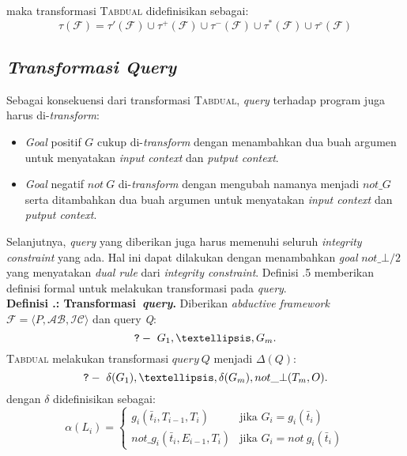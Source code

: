 maka transformasi \textsc{Tabdual} didefinisikan sebagai:
\begin{displaymath}
	\tau(\mathcal{F}) = \tau'(\mathcal{F}) \cup \tau^+(\mathcal{F}) \cup \tau^-(\mathcal{F}) \cup \tau^*(\mathcal{F}) \cup \tau^\circ(\mathcal{F})
\end{displaymath}

\subsection{\textit{Transformasi \textit{Query}}}
\label{transquery}

Sebagai konsekuensi dari transformasi \textsc{Tabdual}, \textit{query} terhadap program juga harus di-\textit{transform}:

\begin{itemize}
	\item \textit{Goal} positif $G$ cukup di-\textit{transform} dengan menambahkan dua buah argumen untuk menyatakan \textit{input context} dan \textit{putput context}.
	\item \textit{Goal} negatif $not \ G$ di-\textit{transform} dengan mengubah namanya menjadi $not\_G$ serta ditambahkan dua buah argumen untuk menyatakan \textit{input context} dan \textit{putput context}.
\end{itemize}

Selanjutnya, \textit{query} yang diberikan juga harus memenuhi seluruh \textit{integrity constraint} yang ada. Hal ini dapat dilakukan dengan menambahkan \textit{goal} $not\_\bot/2$ yang menyatakan \textit{dual rule} dari \textit{integrity constraint}. Definisi \thebabTigaNum.5 memberikan definisi formal untuk melakukan transformasi pada \textit{query}.
\\

\noindent \textbf{Definisi \thebabTigaNum.\thedefBabTiga: Transformasi\ \textit{query}.} Diberikan \textit{abductive framework} $\mathcal{F} = \langle  P,\mathcal{AB},\mathcal{IC} \rangle$ dan query \textit{Q}:
\begin{displaymath}
	\text{\texttt{?}}- \ G_1, \textellipsis , G_m.
\end{displaymath}
\textsc{Tabdual} melakukan transformasi $query \ Q$ menjadi $\Delta(Q)$:
\begin{displaymath}
	\text{\texttt{?}}- \ \delta(G_1), \textellipsis , \delta(G_m), not\_\bot(T_m,O).
\end{displaymath}
dengan $\delta$ didefinisikan sebagai:
\begin{displaymath}
\alpha(L_i) = 
\begin{cases}
g_i(\bar{t}_i,T_{i-1},T_i) 		& \text{jika $G_i = g_i(\bar{t}_i)$} \\
not\_g_i(\bar{t}_i,E_{i-1},T_i) 	& \text{jika $G_i = not \ g_i(\bar{t}_i)$}
\end{cases}
\end{displaymath}

